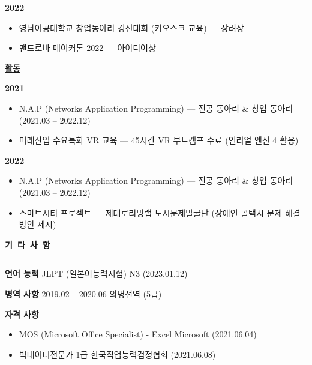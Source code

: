 \documentclass[a4paper, 10pt]{article}
\newcommand{\resumesection}[1]{%
  \vspace{8pt}
  \noindent
  {\large\bfseries #1}
  \vspace{2pt}
  \noindent\hrule
  \vspace{4pt}
}
\begin{document}
\vspace{2pt}
\noindent
\textbf{2022}

\begin{itemize}
  \setlength{\itemsep}{1pt}
  \setlength{\parskip}{0pt}
  \item 영남이공대학교 창업동아리 경진대회 (키오스크 교육) — 장려상
  \item 맨드로바 메이커톤 2022 — 아이디어상
\end{itemize}

\vspace{4pt}
\noindent
\textbf{\underline{활동}}

\vspace{2pt}
\noindent
\textbf{2021}

\begin{itemize}
  \setlength{\itemsep}{1pt}
  \setlength{\parskip}{0pt}
  \item N.A.P (Networks Application Programming) — 전공 동아리 & 창업 동아리 (2021.03 -- 2022.12)
  \item 미래산업 수요특화 VR 교육 — 45시간 VR 부트캠프 수료 (언리얼 엔진 4 활용)
\end{itemize}

\vspace{2pt}
\noindent
\textbf{2022}

\begin{itemize}
  \setlength{\itemsep}{1pt}
  \setlength{\parskip}{0pt}
  \item N.A.P (Networks Application Programming) — 전공 동아리 & 창업 동아리 (2021.03 -- 2022.12)
  \item 스마트시티 프로젝트 — 제대로리빙랩 도시문제발굴단 (장애인 콜택시 문제 해결방안 제시)
\end{itemize}


\newpage

\resumesection{기\ 타\ 사\ 항}

\vspace{3pt}
\noindent
\textbf{언어 능력} \hfill JLPT (일본어능력시험) N3 (2023.01.12)

\vspace{2pt}
\noindent
\textbf{병역 사항} \hfill 2019.02 -- 2020.06 의병전역 (5급)

\vspace{2pt}
\noindent
\textbf{자격 사항}

\begin{itemize}
  \setlength{\itemsep}{1pt}
  \setlength{\parskip}{0pt}
  \item MOS (Microsoft Office Specialist) - Excel \hfill Microsoft (2021.06.04)
  \item 빅데이터전문가 1급 \hfill 한국직업능력검정협회 (2021.06.08)
\end{itemize}
\end{document}
